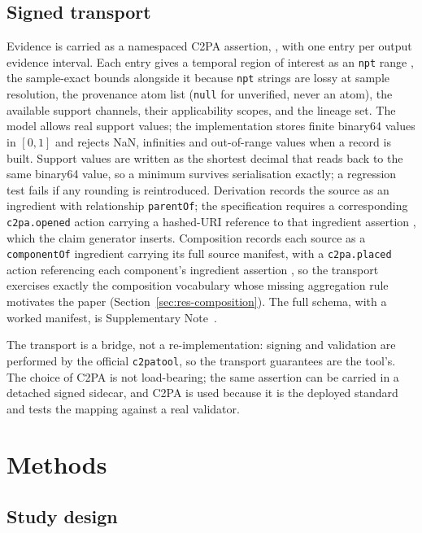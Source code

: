 \documentclass[preprint,3p,11pt,authoryear]{elsarticle}
\begin{document}
\subsection{Signed transport}
\label{sec:transport}

Evidence is carried as a namespaced C2PA assertion,
\texttt{\Clabel{}}, with one entry per output evidence
interval. Each entry gives a temporal region of interest as an \texttt{npt}
range \citep[\S18.2.2.3]{c2pa24}, the sample-exact bounds alongside it because
\texttt{npt} strings are lossy at sample resolution, the provenance atom list
(\texttt{null} for unverified, never an atom), the available support channels,
their applicability scopes, and the lineage set. The model allows real support
values; the implementation stores finite binary64 values in $[0,1]$ and rejects
NaN, infinities and out-of-range values when a record is built. Support values are written as
the shortest decimal that reads back to the same binary64 value, so a minimum
survives serialisation exactly; a regression test fails if any rounding is
reintroduced. Derivation records the source
as an ingredient with relationship \texttt{parentOf}; the specification requires
a corresponding \texttt{c2pa.opened} action carrying a hashed-URI reference to
that ingredient assertion \citep[\S15.11.3.2]{c2pa24}, which the claim generator
inserts. Composition records each source as a \texttt{componentOf} ingredient
carrying its full source manifest, with a \texttt{c2pa.placed} action
referencing each component's ingredient assertion \citep[\S18.16.3]{c2pa24},
so the transport exercises exactly the composition vocabulary whose missing
aggregation rule motivates the paper (Section~\ref{sec:res-composition}). The
full schema, with a worked manifest, is Supplementary Note~\NoteSchema{}.

The transport is a bridge, not a re-implementation: signing and validation are
performed by the official \texttt{c2patool}, so the transport guarantees are
the tool's. The choice of C2PA is not load-bearing; the same assertion can be
carried in a detached signed sidecar, and C2PA is used because it is the
deployed standard and tests the mapping against a real validator.

\section{Methods}
\label{sec:methods}

\subsection{Study design}
\end{document}
